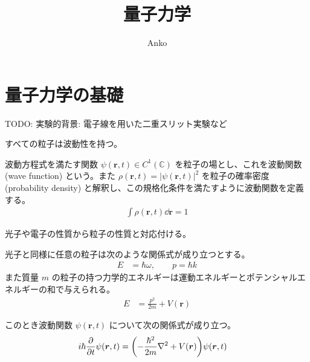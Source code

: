 \documentclass[uplatex,dvipdfmx,a4paper,11pt]{jlreq}
\title{量子力学}
\author{Anko}
\newcommand{\CC}{\mathbb{C}}
\newcommand{\rr}{\bm{r}}
\theoremstyle{definition}
\begin{document}
\maketitle

\section{量子力学の基礎}
TODO: 実験的背景: 電子線を用いた二重スリット実験など
\begin{definition}
  すべての粒子は波動性を持つ。
\end{definition}

\begin{definition}
  波動方程式を満たす関数 $\psi(\rr, t)\in C^1(\CC)$ を粒子の場とし、これを波動関数 (wave function) という。また $\rho(\rr, t) = |\psi(\rr, t)|^2$ を粒子の確率密度 (probability density) と解釈し、この規格化条件を満たすように波動関数を定義する。
  \begin{align}
    \int\rho(\rr, t)\dd{\rr} = 1
  \end{align}
\end{definition}
光子や電子の性質から粒子の性質と対応付ける。
\begin{definition}[ド・ブロイの関係式]
  光子と同様に任意の粒子は次のような関係式が成り立つとする。
  \begin{align}
    E & = \hbar\omega, \qquad p = \hbar k
  \end{align}
  また質量 $m$ の粒子の持つ力学的エネルギーは運動エネルギーとポテンシャルエネルギーの和で与えられる。
  \begin{align}
    E & = \frac{p^2}{2m} + V(\rr)
  \end{align}
\end{definition}
\begin{theorem}
  このとき波動関数 $\psi(\rr, t)$ について次の関係式が成り立つ。
  \begin{align}
    i\hbar\pdv{t}\psi(\rr, t) & = \qty(-\frac{\hbar^2}{2m}\nabla^2 + V(\rr))\psi(\rr, t)
  \end{align}
\end{theorem}
\end{document}
